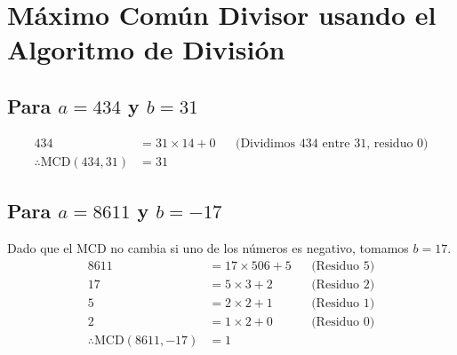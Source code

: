 \documentclass{article}
\begin{document}
\section*{Máximo Común Divisor usando el Algoritmo de División}

\subsection*{Para \(a = 434\) y \(b = 31\)}
\begin{align*}
434 & = 31 \times 14 + 0 &&\text{(Dividimos 434 entre 31, residuo 0)} \\
\therefore \text{MCD}(434,31) & = 31 
\end{align*}

\subsection*{Para \(a = 8611\) y \(b = -17\)}
Dado que el MCD no cambia si uno de los números es negativo, tomamos \(b = 17\).
\begin{align*}
8611 & = 17 \times 506 + 5 &&\text{(Residuo 5)} \\
17 & = 5 \times 3 + 2 &&\text{(Residuo 2)} \\
5 & = 2 \times 2 + 1 &&\text{(Residuo 1)} \\
2 & = 1 \times 2 + 0 &&\text{(Residuo 0)} \\
\therefore \text{MCD}(8611,-17) & = 1 
\end{align*}
\end{document}

